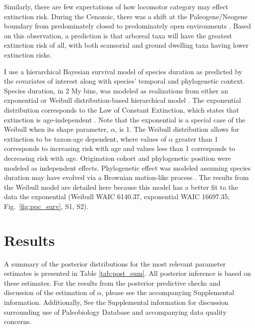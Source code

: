 Similarly, there are few expectations of how locomotor category may effect extinction risk. During the Cenozoic, there was a shift at the Paleogene/Neogene boundary from predominately closed to predominately open environments \cite{Blois2009,Janis1993a}. Based on this observation, a prediction is that arboreal taxa will have the greatest extinction risk of all, with both scansorial and ground dwelling taxa having lower extinction risks. 

I use a hierarchical Bayesian survival model of species duration as predicted by the covariates of interest along with species' temporal and phylogenetic context. Species duration, in 2 My bins, was modeled as realizations from either an exponential or Weibull distribution-based hierarchical model \cite{Gelman2013d}. The exponential distribution corresponds to the Law of Constant Extinction, which states that extinction is age-independent \cite{VanValen1973}. Note that the exponential is a special case of the Weibull when its shape parameter, $\alpha$, is 1. The Weibull distribution allows for extinction to be taxon-age dependent, where values of $\alpha$ greater than 1 corresponds to increasing risk with age and values less than 1 corresponds to decreasing risk with age. Origination cohort and phylogenetic position were modeled as independent effects. Phylogenetic effect was modeled assuming species duration may have evolved via a Brownian motion-like process \cite{Lynch1991,Housworth2004}. The results from the Weibull model are detailed here because this model has a better fit to the data the exponential (Weibull WAIC 6140.37, exponential WAIC 16697.35; Fig.~\ref{fig:ppc_surv}, S1, S2).


\section{Results}
A summary of the posterior distributions for the most relevant parameter estimates is presented in Table \ref{tab:post_sum}. All posterior inference is based on these estimates. For the results from the posterior predictive checks and discussion of the estimation of $\alpha$, please see the accompanying Supplemental information. Additionally, See the Supplemental information for discussion surrounding use of Paleobiology Database and accompanying data quality concerns.

